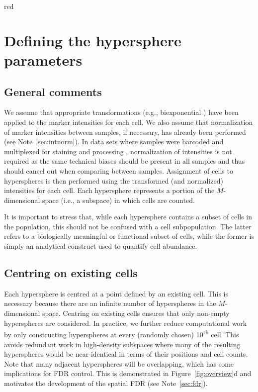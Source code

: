 \documentclass{article}
\begin{document}
\begin{color}{red}
\section{Defining the hypersphere parameters}

\subsection{General comments}
We assume that appropriate transformations (e.g., biexponential \cite{parks2006new}) have been applied to the marker intensities for each cell.
We also assume that normalization of marker intensities between samples, if necessary, has already been performed (see Note~\ref{sec:intnorm}).
In data sets where samples were barcoded and multiplexed for staining and processing \cite{zunder2015palladium}, normalization of intensities is not required as the same technical biases should be present in all samples and thus should cancel out when comparing between samples.
Assignment of cells to hyperspheres is then performed using the transformed (and normalized) intensities for each cell.
Each hypersphere represents a portion of the $M$-dimensional space (i.e., a subspace) in which cells are counted.

It is important to stress that, while each hypersphere contains a subset of cells in the population, this should not be confused with a cell subpopulation.
The latter refers to a biologically meaningful or functional subset of cells, while the former is simply an analytical construct used to quantify cell abundance.

\subsection{Centring on existing cells}
Each hypersphere is centred at a point defined by an existing cell.
This is necessary because there are an infinite number of hyperspheres in the $M$-dimensional space.
Centring on existing cells ensures that only non-empty hyperspheres are considered.
In practice, we further reduce computational work by only constructing hyperspheres at every (randomly chosen) 10\textsuperscript{th} cell.
This avoids redundant work in high-density subspaces where many of the resulting hyperspheres would be near-identical in terms of their positions and cell counts.
Note that many adjacent hyperspheres will be overlapping, which has some implications for FDR control.
This is demonstrated in Figure~\ref{fig:overview}d and motivates the development of the spatial FDR (see Note~\ref{sec:fdr}).


\end{color}
\end{document}
